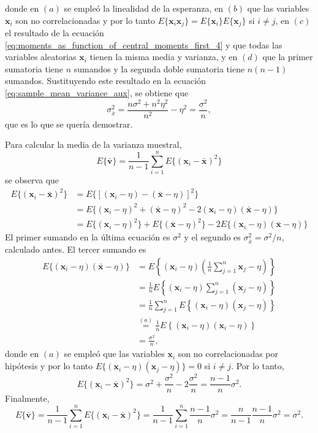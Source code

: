 \documentclass[a4paper]{report}
\newcommand{\x}{\mathbf{x}}
\begin{document}
donde en \((a)\) se empleó la linealidad de la esperanza, en \((b)\) que las variables \(\x_i\) son no correlacionadas y por lo tanto \(E\{\x_i\x_j\}=E\{\x_i\}E\{\x_j\}\) si \(i\neq j\), en \((c)\) el resultado de la ecuación \ref{eq:moments_as_function_of_central_moments_first_4} y que todas las variables aleatorias \(\x_i\) tienen la misma media y varianza, y en \((d)\)  que la primer sumatoria tiene \(n\) sumandos y la segunda doble sumatoria tiene \(n(n-1)\) sumandos. Sustituyendo este resultado en la ecuación \ref{eq:sample_mean_variance_aux}, se obtiene que
\[
 \sigma_{\bar{x}}^2=\frac{n\sigma^2+n^2\eta^2}{n^2}-\eta^2=\frac{\sigma^2}{n},
\]
que es lo que se quería demostrar.

Para calcular la media de la varianza muestral, 
\[
 E\{\bar{\mathbf{v}}\}=\frac{1}{n-1}\sum_{i=1}^{n}E\{(\x_i-\bar{\x})^2\}
\]
se observa que
\begin{align*}
 E\{(\x_i-\bar{\x})^2\}&=E\{[(\x_i-\eta)-(\bar{\x}-\eta)]^2\}\\
  &=E\{(\x_i-\eta)^2+(\bar{\x}-\eta)^2-2(\x_i-\eta)(\bar{\x}-\eta)\}\\
  &=E\{(\x_i-\eta)^2\}+E\{(\bar{\x}-\eta)^2\}-2E\{(\x_i-\eta)(\bar{\x}-\eta)\}
\end{align*}
El primer sumando en la última ecuación es \(\sigma^2\) y el segundo es \(\sigma^2_{\bar{x}}=\sigma^2/n\), calculado antes. El tercer sumando es
\begin{align*}
 E\{(\x_i-\eta)(\bar{\x}-\eta)\}&=E\left\{(\x_i-\eta)\left(\frac{1}{n}\sum_{j=1}^{n}\x_j-\eta\right)\right\}\\
   &=\frac{1}{n}E\left\{(\x_i-\eta)\sum_{j=1}^{n}\left(\x_j-\eta\right)\right\}\\
   &=\frac{1}{n}\sum_{j=1}^{n}E\left\{(\x_i-\eta)\left(\x_j-\eta\right)\right\}\\
   &\overset{(a)}{=}\frac{1}{n}E\left\{(\x_i-\eta)\left(\x_i-\eta\right)\right\}\\
   &=\frac{\sigma^2}{n},
\end{align*}
donde en \((a)\) se empleó que las variables \(\x_i\) son no correlacionadas por hipótesis y por lo tanto \(E\{(\x_i-\eta)(\x_j-\eta)\}=0\) si \(i\neq j\).
Por lo tanto,
\[
 E\{(\x_i-\bar{\x})^2\}=\sigma^2+\frac{\sigma^2}{n}-2\frac{\sigma^2}{n}=\frac{n-1}{n}\sigma^2.
\]
Finalmente,
\[
 E\{\bar{\mathbf{v}}\}=\frac{1}{n-1}\sum_{i=1}^{n}E\{(\x_i-\bar{\x})^2\}=\frac{1}{n-1}\sum_{i=1}^{n}\frac{n-1}{n}\sigma^2=\frac{n}{n-1}\frac{n-1}{n}\sigma^2=\sigma^2.
\]
\end{document}
